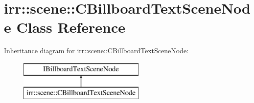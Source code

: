 \hypertarget{classirr_1_1scene_1_1_c_billboard_text_scene_node}{\section{irr\-:\-:scene\-:\-:C\-Billboard\-Text\-Scene\-Node Class Reference}
\label{classirr_1_1scene_1_1_c_billboard_text_scene_node}
}
Inheritance diagram for irr\-:\-:scene\-:\-:C\-Billboard\-Text\-Scene\-Node\-:\begin{figure}[H]
\begin{center}
\leavevmode
\includegraphics[height=2.000000cm]{classirr_1_1scene_1_1_c_billboard_text_scene_node}
\end{center}
\end{figure}
